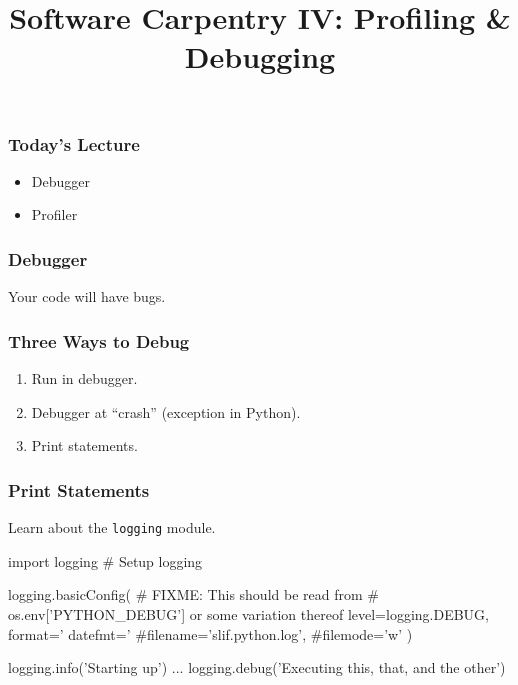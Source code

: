 
\title{Software Carpentry IV: Profiling \& Debugging}

\frame{\maketitle}

\begin{frame}[fragile]
\frametitle{Today's Lecture}

\begin{itemize}
\item Debugger
\item Profiler
\end{itemize}

\end{frame}

\begin{frame}[fragile]
\frametitle{Debugger}

Your code will have bugs.

\end{frame}

\begin{frame}[fragile]
\frametitle{Three Ways to Debug}

\begin{enumerate}
\item Run in debugger.
\item Debugger at ``crash'' (exception in Python).
\item Print statements.
\end{enumerate}

\end{frame}

\begin{frame}[fragile]
\frametitle{Print Statements}

Learn about the \texttt{logging} module.

\begin{python}
import logging
# Setup logging

logging.basicConfig(
   # FIXME: This should be read from
   # os.env['PYTHON_DEBUG'] or some variation thereof
   level=logging.DEBUG,
   format='%
   datefmt='%
   #filename='slif.python.log',
   #filemode='w'
   )

logging.info('Starting up')
...
logging.debug('Executing this, that, and the other')
\end{python}

\end{frame}

